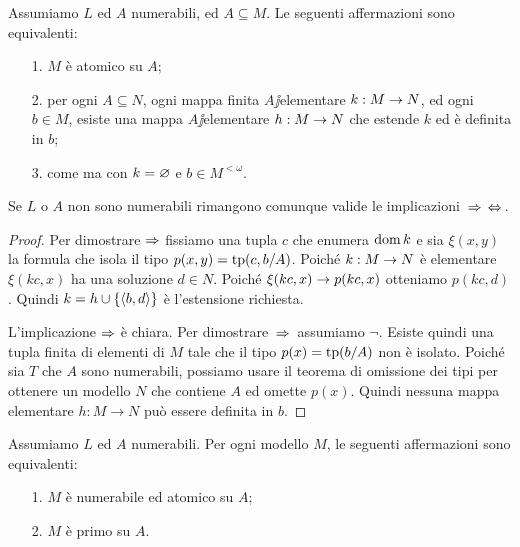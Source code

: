 \begin{lemma}\label{atomicoestensione}
Assumiamo $L$ ed $A$ numerabili, ed $A\subseteq M$. Le seguenti affermazioni sono equivalenti:
\begin{itemize}
\item[1.] $M$ \`e atomico su $A$;
\item[2.] per ogni $A\subseteq N$, ogni mappa finita $A\jj$elementare $k:M\rightarrow N$, ed ogni $b\in M$, esiste una mappa $A\jj$elementare $h:M\rightarrow N$ che estende $k$ ed \`e definita in $b$;
\item[3.] come  ma con $k=\varnothing$ e $b\in M^{<\omega}$.
\end{itemize}
Se $L$ o $A$ non sono numerabili rimangono comunque valide le implicazioni $\,\Rightarrow\,$$\,\Leftrightarrow\,$.
\end{lemma}
\begin{proof}
Per dimostrare $\Rightarrow$ fissiamo una tupla $c$ che enumera $\mathop{\rm dom} k$ e sia $\xi(x,y)$ la formula che isola il tipo  $p(x,y)=\textrm{tp}(c,b/A)$. Poich\'e $k:M\rightarrow N$ \`e elementare $\xi(kc,x)$ ha una soluzione $d\in N$. Poich\'e $\xi(kc,x)\rightarrow p(kc,x)$ otteniamo $p(kc,d)$. Quindi $k=h\cup\{\langle b,d\rangle\}$ \`e l'estensione richiesta.

L'implicazione $\Rightarrow$ \`e chiara. Per dimostrare $\,\Rightarrow\,$ assumiamo $\neg$. Esiste quindi una tupla finita di elementi di $M$ tale che il tipo $p(x)=\textrm{tp}(b/A)$ non \`e isolato. Poich\'e sia $T$ che $A$ sono numerabili, possiamo usare il teorema di omissione dei tipi per ottenere un modello $N$ che contiene $A$ ed omette $p(x)$. Quindi nessuna mappa elementare $h:M\to N$ pu\`o essere definita in $b$.
\end{proof}

\begin{theorem}\label{atomicoprimo}
Assumiamo $L$ ed $A$ numerabili. Per ogni modello $M$, le seguenti affermazioni sono equivalenti:
\begin{itemize}
\item[1.] $M$ \`e numerabile ed atomico su $A$;
\item[2.] $M$ \`e primo su $A$.
\end{itemize}
\end{theorem}

